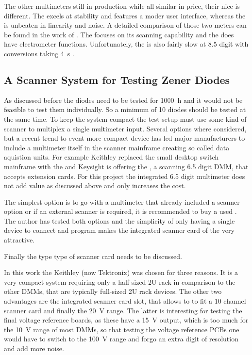 The other multimeters still in production while all similar in price, their nice is different. The  excels at stability and features a moder user interface, whereas the  is unbeaten in linearity and noise. A detailed comparison of those two meters can be found in the work of \citeauthor*{article_fluke_8588A_noise} \cite{article_fluke_8588A_noise}. The  focuses on its scanning capability and the  does have electrometer functions. Unfortunately, the  is also fairly slow at \num{8.5} digit with conversions taking \qty{4}{\s} \cite{datasheet_transmille8104}.

\subsection{A Scanner System for Testing Zener Diodes}
As discussed before the diodes need to be tested for \qty{1000}{\hour} and it would not be feasible to test them individually. So a minimum of 10 diodes should be tested at the same time. To keep the system compact the test setup must use some kind of scanner to multiplex a single multimeter input. Several options where considered, but a recent trend to event more compact device has led major manufacturers to include a multimeter itself in the scanner mainframe creating so called data aquistion units. For example Keithley replaced the small desktop switch mainframe  with the  and Keysight is offering the , a scanning \num{6.5} digit DMM, that accepts extension cards. For this project the integrated \num{6.5} digit multimeter does not add value as discussed above and only increases the cost.

The simplest option is to go with a multimeter that already included a scanner option or if an external scanner is required, it is recommended to buy a used . The author has tested both options and the simplicity of only having a single device to connect and program makes the integrated scanner card of the  very attractive.

Finally the type type of scanner card needs to be discussed.



In this work the Keithley (now Tektronix)  was chosen for three reasons. It is a very compact system requiring only a half-sized 2U rack in comparison to the other DMMs, that are typically full-sized 2U rack devices. The other two advantages are the integrated scanner card slot, that allows to to fit a 10 channel scanner card and finally the \qty{20}{\volt} range. The latter is interesting for testing the final voltage reference boards, as these have a \qty{15}{\volt} output, which is too much for the \qty{10}{\volt} range of most DMMs, so that testing the voltage reference PCBs one would have to switch to the \qty{100}{\volt} range and forgo an extra digit of resolution and add more noise.



